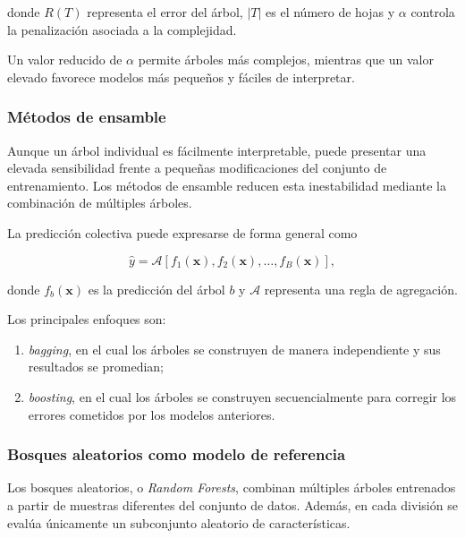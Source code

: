 donde $R(T)$ representa el error del árbol, $|T|$ es el número de hojas y $\alpha$ controla la penalización asociada a la complejidad.

Un valor reducido de $\alpha$ permite árboles más complejos, mientras que un valor elevado favorece modelos más pequeños y fáciles de interpretar.

\subsubsection{Métodos de ensamble}

Aunque un árbol individual es fácilmente interpretable, puede presentar una elevada sensibilidad frente a pequeñas modificaciones del conjunto de entrenamiento. Los métodos de ensamble reducen esta inestabilidad mediante la combinación de múltiples árboles.

La predicción colectiva puede expresarse de forma general como

\begin{equation}
\hat{y}
=
\mathcal{A}
\left[
f_1(\mathbf{x}),
f_2(\mathbf{x}),
\ldots,
f_B(\mathbf{x})
\right],
\end{equation}

donde $f_b(\mathbf{x})$ es la predicción del árbol $b$ y $\mathcal{A}$ representa una regla de agregación.

Los principales enfoques son:

\begin{enumerate}
    \item \textit{bagging}, en el cual los árboles se construyen de manera independiente y sus resultados se promedian;
    \item \textit{boosting}, en el cual los árboles se construyen secuencialmente para corregir los errores cometidos por los modelos anteriores.
\end{enumerate}

\subsubsection{Bosques aleatorios como modelo de referencia}

Los bosques aleatorios, o \textit{Random Forests}, combinan múltiples árboles entrenados a partir de muestras diferentes del conjunto de datos. Además, en cada división se evalúa únicamente un subconjunto aleatorio de características.

